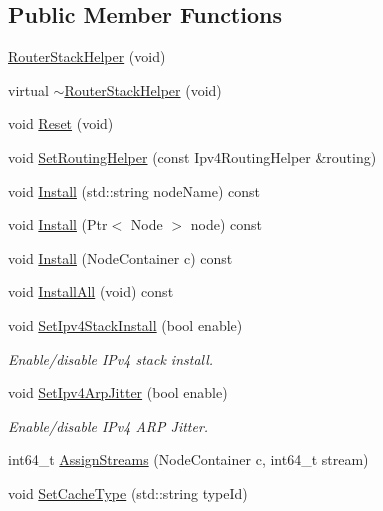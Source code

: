 \subsection*{Public Member Functions}
\begin{DoxyCompactItemize}
\item 
\hyperlink{classns3_1_1RouterStackHelper_afe2cc8f748caa13e72f9e2616b77c0e0}{Router\-Stack\-Helper} (void)
\item 
virtual \hyperlink{classns3_1_1RouterStackHelper_a3673fd8fb8184df5782b6e8538f6f1f6}{$\sim$\-Router\-Stack\-Helper} (void)
\item 
void \hyperlink{classns3_1_1RouterStackHelper_a0980b1c2c1fe1d05c40407558d06d649}{Reset} (void)
\item 
void \hyperlink{classns3_1_1RouterStackHelper_af322270b340c9f3b8df134d6e40671f3}{Set\-Routing\-Helper} (const Ipv4\-Routing\-Helper \&routing)
\item 
void \hyperlink{classns3_1_1RouterStackHelper_a94bdee66b5610184b317cdf107b27009}{Install} (std\-::string node\-Name) const 
\item 
void \hyperlink{classns3_1_1RouterStackHelper_a1fc5ba02a5cf54f0f008c15c4274531f}{Install} (Ptr$<$ Node $>$ node) const 
\item 
void \hyperlink{classns3_1_1RouterStackHelper_aa3d80267344ae81207ed2b5f1fab10bd}{Install} (Node\-Container c) const 
\item 
void \hyperlink{classns3_1_1RouterStackHelper_a46c4452fb80e27565675e69ee1a8f0f3}{Install\-All} (void) const 
\item 
void \hyperlink{classns3_1_1RouterStackHelper_a232b94c9750c49a70171b9aa3f9151b9}{Set\-Ipv4\-Stack\-Install} (bool enable)
\begin{DoxyCompactList}\small\item\em Enable/disable I\-Pv4 stack install. \end{DoxyCompactList}\item 
void \hyperlink{classns3_1_1RouterStackHelper_a33d51c290dae0395823847050645a38c}{Set\-Ipv4\-Arp\-Jitter} (bool enable)
\begin{DoxyCompactList}\small\item\em Enable/disable I\-Pv4 A\-R\-P Jitter. \end{DoxyCompactList}\item 
int64\-\_\-t \hyperlink{classns3_1_1RouterStackHelper_a150c650fa7384b68f6cc3b20e848b225}{Assign\-Streams} (Node\-Container c, int64\-\_\-t stream)
\item 
void \hyperlink{classns3_1_1RouterStackHelper_a957f8f558018bc7bfde76dc6047f64fd}{Set\-Cache\-Type} (std\-::string type\-Id)

\end{DoxyCompactItemize}
